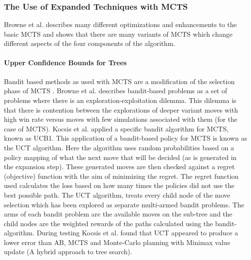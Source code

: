 \documentclass[journal]{IEEEtran}
\begin{document}
  \subsubsection{The Use of Expanded Techniques with MCTS}
  Browne et al. \cite{survey} describes many different optimizations and enhancements to the basic MCTS and shows that there are many variants of MCTS which change different aspects of the four components of the algorithm.
  \\\\
  \textbf{Upper Confidence Bounds for Trees}\\\\
  Bandit based methods as used with MCTS are a modification of the selection phase of MCTS \cite{survey}. Browne et al. \cite{survey} describes bandit-based problems as a set of problems where there is an exploration-exploitation dilemma. This dilemma is that there is contention between the explorations of deeper variant moves with high win rate versus moves with few simulations associated with them (for the case of MCTS). Kocsis et al. \cite{bandit} applied a specific bandit algorithm for MCTS, known as UCB1. This application of a bandit-based policy for MCTS is known as the UCT algorithm. Here the algorithm uses random probabilities based on a policy mapping of what the next move that will be decided (as is generated in the expansion step). These generated moves are then checked against a regret (objective) function with the aim of minimizing the regret. The regret function used calculates the loss based on how many times the policies did not use the best possible path. The UCT algorithm, treats every child node of the move selection which has been explored as separate multi-armed bandit problems. The arms of each bandit problem are the available moves on the sub-tree and the child nodes are the weighted rewards of the paths calculated using the bandit-algorithm. During testing Kocsis et al. \cite{bandit} found that UCT appeared to produce a lower error than AB, MCTS and Monte-Carlo planning with Minimax value update (A hybrid approach to tree search).\\
  
\end{document}
